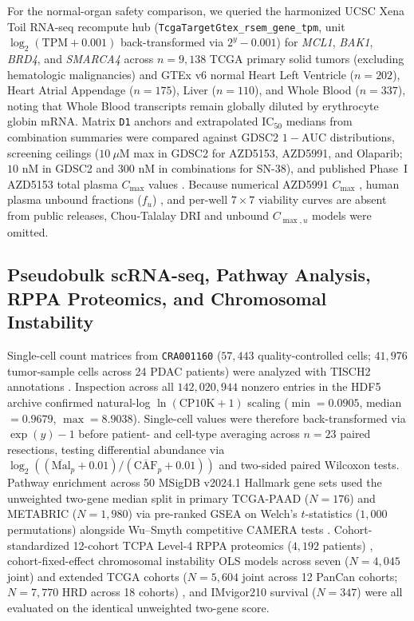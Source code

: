 \documentclass[10pt,twocolumn]{article}
\begin{document}
For the normal-organ safety comparison, we queried the harmonized UCSC Xena Toil RNA-seq recompute hub (\texttt{TcgaTargetGtex\_rsem\_gene\_tpm}, unit $\log_2(\text{TPM}+0.001)$ back-transformed via $2^y - 0.001$) \cite{vivian2017} for \textit{MCL1}, \textit{BAK1}, \textit{BRD4}, and \textit{SMARCA4} across $n = 9,138$ TCGA primary solid tumors (excluding hematologic malignancies) and GTEx v6 normal Heart Left Ventricle ($n = 202$), Heart Atrial Appendage ($n = 175$), Liver ($n = 110$), and Whole Blood ($n = 337$), noting that Whole Blood transcripts remain globally diluted by erythrocyte globin mRNA. Matrix \texttt{D1} anchors and extrapolated $\text{IC}_{50}$ medians from combination summaries were compared against GDSC2 $1 - \text{AUC}$ distributions, screening ceilings ($10\ \mu\text{M}$ max in GDSC2 for AZD5153, AZD5991, and Olaparib; $10\text{ nM}$ in GDSC2 and $300\text{ nM}$ in combinations for SN-38), and published Phase~I AZD5153 total plasma $C_{\max}$ values \cite{hamilton2023}. Because numerical AZD5991 $C_{\max}$ \cite{desai2024}, human plasma unbound fractions ($f_u$) \cite{tron2018}, and per-well $7 \times 7$ viability curves are absent from public releases, Chou-Talalay $\text{DRI}$ and unbound $C_{\max, u}$ models were omitted.

\subsection{Pseudobulk scRNA-seq, Pathway Analysis, RPPA Proteomics, and Chromosomal Instability}
Single-cell count matrices from \texttt{CRA001160} ($57,443$ quality-controlled cells; $41,976$ tumor-sample cells across 24 PDAC patients) \cite{peng2019} were analyzed with TISCH2 annotations \cite{han2023}. Inspection across all $142,020,944$ nonzero entries in the HDF5 archive confirmed natural-log $\ln(\text{CP10K}+1)$ scaling ($\min = 0.0905$, median $= 0.9679$, $\max = 8.9038$). Single-cell values were therefore back-transformed via $\exp(y) - 1$ before patient- and cell-type averaging across $n = 23$ paired resections, testing differential abundance via $\log_2((\overline{\text{Mal}}_p + 0.01)/(\overline{\text{CAF}}_p + 0.01))$ and two-sided paired Wilcoxon tests. Pathway enrichment across 50 MSigDB v2024.1 Hallmark gene sets \cite{liberzon2015} used the unweighted two-gene median split in primary TCGA-PAAD ($N = 176$) and METABRIC ($N = 1,980$) via pre-ranked GSEA on Welch's $t$-statistics ($1,000$ permutations) alongside Wu--Smyth competitive CAMERA tests \cite{wu2012}. Cohort-standardized 12-cohort TCPA Level-4 RPPA proteomics ($4,192$ patients) \cite{li2013,akbani2014}, cohort-fixed-effect chromosomal instability OLS models across seven ($N = 4,045$ joint) and extended TCGA cohorts ($N = 5,604$ joint across 12 PanCan cohorts; $N = 7,770$ HRD across 18 cohorts) \cite{knijnenburg2018}, and IMvigor210 survival ($N = 347$) \cite{mariathasan2018} were all evaluated on the identical unweighted two-gene score.
\end{document}
